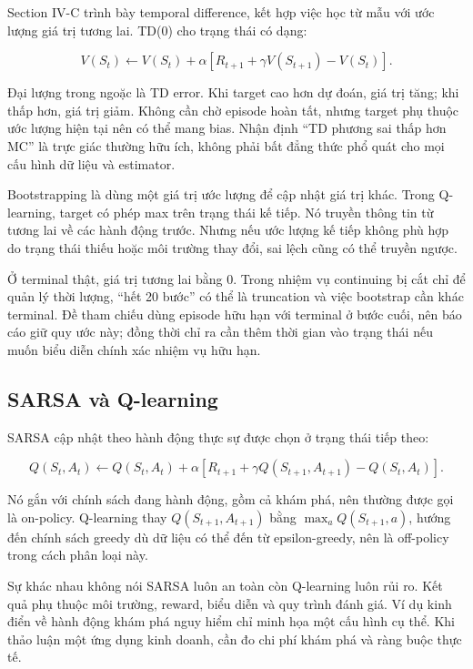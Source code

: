 Section IV-C trình bày temporal difference, kết hợp việc học từ mẫu với
ước lượng giá trị tương lai. TD(0) cho trạng thái có dạng:

\[V(S_t)\leftarrow V(S_t)+\alpha\left[R_{t+1}+\gamma V(S_{t+1})-V(S_t)\right].\]

Đại lượng trong ngoặc là TD error. Khi target cao hơn dự đoán, giá trị
tăng; khi thấp hơn, giá trị giảm. Không cần chờ episode hoàn tất, nhưng
target phụ thuộc ước lượng hiện tại nên có thể mang bias. Nhận định ``TD
phương sai thấp hơn MC'' là trực giác thường hữu ích, không phải bất
đẳng thức phổ quát cho mọi cấu hình dữ liệu và estimator.

Bootstrapping là dùng một giá trị ước lượng để cập nhật giá trị khác.
Trong Q-learning, target có phép max trên trạng thái kế tiếp. Nó truyền
thông tin từ tương lai về các hành động trước. Nhưng nếu ước lượng kế
tiếp không phù hợp do trạng thái thiếu hoặc môi trường thay đổi, sai
lệch cũng có thể truyền ngược.

Ở terminal thật, giá trị tương lai bằng 0. Trong nhiệm vụ continuing bị
cắt chỉ để quản lý thời lượng, ``hết 20 bước'' có thể là truncation và
việc bootstrap cần khác terminal. Đề tham chiếu dùng episode hữu hạn với
terminal ở bước cuối, nên báo cáo giữ quy ước này; đồng thời chỉ ra cần
thêm thời gian vào trạng thái nếu muốn biểu diễn chính xác nhiệm vụ hữu
hạn.

\subsection{SARSA và Q-learning}\label{sarsa-vuxe0-q-learning}

SARSA cập nhật theo hành động thực sự được chọn ở trạng thái tiếp theo:

\[Q(S_t,A_t)\leftarrow Q(S_t,A_t)+\alpha[R_{t+1}+\gamma Q(S_{t+1},A_{t+1})-Q(S_t,A_t)].\]

Nó gắn với chính sách đang hành động, gồm cả khám phá, nên thường được
gọi là on-policy. Q-learning thay \(Q(S_{t+1},A_{t+1})\) bằng
\(\max_aQ(S_{t+1},a)\), hướng đến chính sách greedy dù dữ liệu có thể
đến từ epsilon-greedy, nên là off-policy trong cách phân loại này.

Sự khác nhau không nói SARSA luôn an toàn còn Q-learning luôn rủi ro.
Kết quả phụ thuộc môi trường, reward, biểu diễn và quy trình đánh giá.
Ví dụ kinh điển về hành động khám phá nguy hiểm chỉ minh họa một cấu
hình cụ thể. Khi thảo luận một ứng dụng kinh doanh, cần đo chi phí khám
phá và ràng buộc thực tế.


